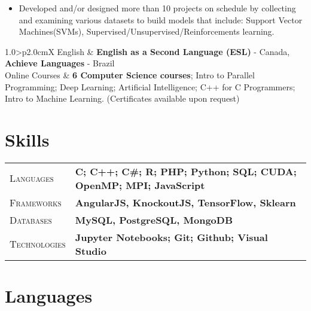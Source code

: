 \documentclass[9pt, a4paper, oneside, final]{scrartcl} %
\newcommand{\gray}{\rowcolor[gray]{.90}} %
\begin{document}
\begin{itemize}
\item Developed and/or designed more than 10 projects on schedule by collecting and examining various datasets to build models that include: Support Vector Machines(SVMs), Supervised/Unsupervised/Reinforcements learning.
\end{itemize}


\begin{center}
\begin{tabularx}{1.0\linewidth}{>{\raggedleft\scshape}p{2.0cm}X}
\gray English & \textbf{English as a Second Language (ESL)} - Canada, 
          \textbf{Achieve Languages} - Brazil\\
\gray Online Courses & \textbf{6 Computer Science courses}; Intro to Parallel Programming; Deep Learning; Artificial Intelligence; C++ for C Programmers; Intro to Machine Learning. (Certificates available upon request)
\end{tabularx}
\end{center}


\section{Skills}

\begin{center}
\begin{tabularx}{1.0\linewidth}{>{\raggedleft\scshape}p{2.2cm}X}
\gray Languages & \textbf{C; C++; C\#; R; PHP; Python; SQL; CUDA; OpenMP; MPI; JavaScript}\\
\gray Frameworks & \textbf{AngularJS, KnockoutJS, TensorFlow, Sklearn}\\
\gray Databases & \textbf{MySQL, PostgreSQL, MongoDB}\\
\gray Technologies & \textbf{Jupyter Notebooks; Git; Github; Visual Studio}\\
\end{tabularx}
\end{center}


\section{Languages}
\end{document}
